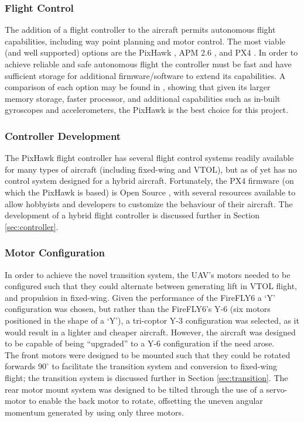 \subsubsection*{Flight Control}
The addition of a flight controller to the aircraft permits autonomous flight capabilities, including way point planning and motor control. The most viable (and well supported) options are the PixHawk \cite{ref:pixhawk}, APM 2.6 \cite{ref:ardupilot}, and PX4 \cite{ref:px4}. In order to achieve reliable and safe autonomous flight the controller must be fast and have sufficient storage for additional firmware/software to extend its capabilities. A comparison of each option may be found in \cite{ref:controller_comparison}, showing that given its larger memory storage, faster processor, and additional capabilities such as in-built gyroscopes and accelerometers, the PixHawk is the best choice for this project.

\subsubsection*{Controller Development}
The PixHawk flight controller has several flight control systems readily available for many types of aircraft (including fixed-wing and VTOL), but as of yet has no control system designed for a hybrid aircraft. Fortunately, the PX4 firmware (on which the PixHawk is based) is Open Source \cite{ref:ardupilotgit}, with several resources available \cite{ref:firmware1,ref:firmware2} to allow hobbyists and developers to customize the behaviour of their aircraft. The development of a hybrid flight controller is discussed further in Section \ref{sec:controller}.

\subsubsection*{Motor Configuration}
In order to achieve the novel transition system, the UAV's motors needed to be configured such that they could alternate between generating lift in VTOL flight, and propulsion in fixed-wing. Given the performance of the FireFLY6 a `Y' configuration was chosen, but rather than the FireFLY6's Y-6 (six motors positioned in the shape of a `Y'), a tri-coptor Y-3 configuration  was selected, as it would result in a lighter and cheaper aircraft. However, the aircraft was designed to be capable of being ``upgraded'' to a Y-6 configuration if the need arose.\\

The front motors were designed to be mounted such that they could be rotated forwards $90^{\circ}$ to facilitate the transition system and conversion to fixed-wing flight; the transition system is discussed further in Section \ref{sec:transition}. The rear motor mount system was designed to be tilted through the use of a servo-motor to enable the back motor to rotate, offsetting the uneven angular momentum generated by using only three motors.
		
